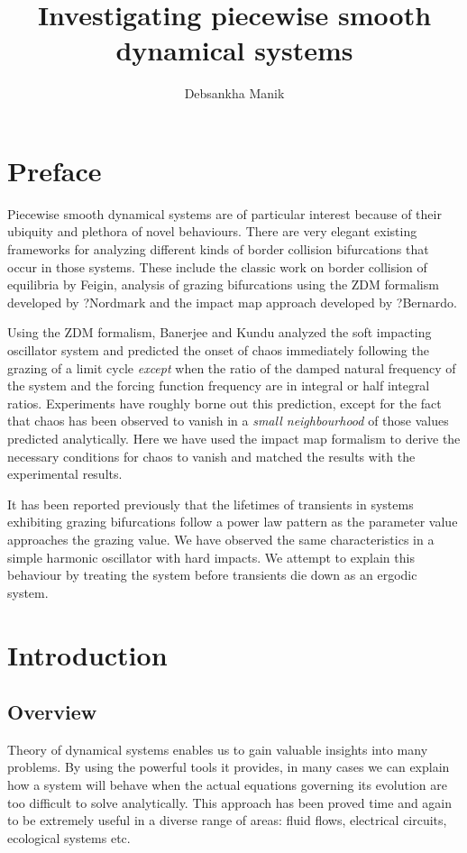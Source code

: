 \documentclass{book}
\renewcommand{\(}{\begin{columns}}
\renewcommand{\)}{\end{columns}}
\newcommand{\<}[1]{\begin{column}{#1}}
\renewcommand{\>}{\end{column}}
\begin{document}
\title{Investigating piecewise smooth dynamical systems}
\author{Debsankha Manik}
\maketitle

\frontmatter
\chapter{Preface}
Piecewise smooth dynamical systems are of particular interest because of their 
ubiquity and plethora of novel behaviours.  There are very elegant existing frameworks
for analyzing different kinds of border collision bifurcations that occur in those systems.
These include the classic work on border collision of equilibria by Feigin, analysis of grazing 
bifurcations using the ZDM formalism developed by ?Nordmark and the impact map 
approach developed by ?Bernardo.  

Using the ZDM formalism, Banerjee and Kundu analyzed the soft impacting oscillator system
and predicted the onset of chaos immediately following the grazing of a limit 
cycle \emph{except} when the ratio of the damped natural frequency of the 
system and the forcing function frequency are in integral or half integral 
ratios.  Experiments have roughly borne out this prediction, except for the 
fact that chaos has been observed to vanish in a \emph{small neighbourhood} of 
those values predicted analytically.  Here we have used the impact map formalism to 
derive the necessary conditions for chaos to vanish and matched the results with the 
experimental results.  

It has been reported previously that the lifetimes of transients in  systems 
exhibiting grazing bifurcations follow a power law pattern as the parameter 
value approaches the grazing value.  We have observed the same characteristics 
in a simple harmonic oscillator with hard impacts.  We attempt to explain this 
behaviour by treating the system before transients die down as an ergodic 
system.  

\tableofcontents

\mainmatter
\chapter{Introduction}
\section{Overview}
Theory of dynamical systems enables us to gain valuable insights into many problems.  By using the powerful 
tools it provides, in many cases we can explain how a system will behave 
when the actual equations governing its evolution are too difficult to solve 
analytically.  This approach has been proved time and again to be extremely 
useful in a diverse range of areas: fluid flows, electrical circuits, 
ecological systems etc.  
\end{document}
